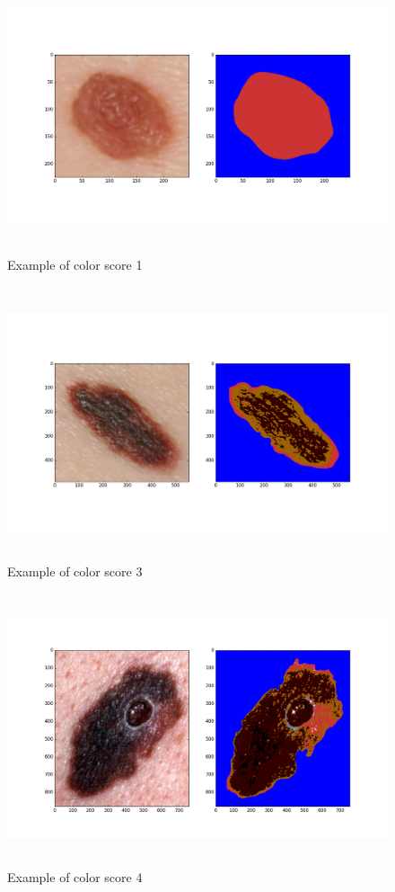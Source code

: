 \begin{figure}[H]
    \includegraphics[height=8cm,keepaspectratio]{assets/color/examples/color_1.png}
    \caption{Example of color score 1}
    \label{fig:color_1}
\end{figure}
\begin{figure}[H]
    \includegraphics[height=8cm,keepaspectratio]{assets/color/examples/color_3.png}
    \caption{Example of color score 3}
    \label{fig:color_3}
\end{figure}
\begin{figure}[H]
    \includegraphics[height=8cm,keepaspectratio]{assets/color/examples/color_4.png}
    \caption{Example of color score 4}
    \label{fig:color_4}
\end{figure}